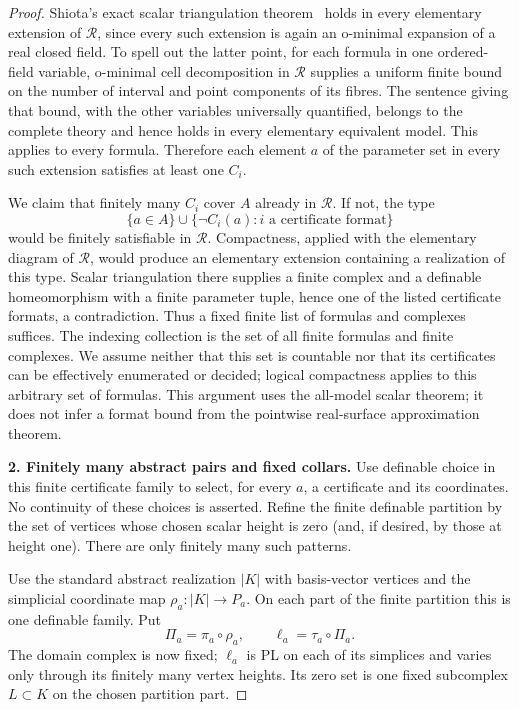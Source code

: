 \begin{proof}
Shiota's exact scalar triangulation theorem~\cite[Theorem 2.2(1), p.~6]{A5-Shiota} holds in every elementary
extension of $\mathcal R$, since every such extension is again an
o-minimal expansion of a real closed field. To spell out the latter point,
for each formula in one ordered-field variable, o-minimal cell decomposition
in $\mathcal R$ supplies a uniform finite bound on the number of interval
and point components of its fibres. The sentence giving that bound, with
the other variables universally quantified, belongs to the complete theory
and hence holds in every elementary equivalent model. This applies to
every formula. Therefore each element $a$ of the parameter set in every
such extension satisfies at least one $C_i$.

We claim that finitely many $C_i$ cover $A$ already in $\mathcal R$.
If not, the type
\[
 \{a\in A\}\cup\{\neg C_i(a): i\text{ a certificate format}\}
 \tag{A5.17.3}
\]
would be finitely satisfiable in $\mathcal R$. Compactness, applied with
the elementary diagram of $\mathcal R$, would produce an elementary
extension containing a realization of this type. Scalar triangulation
there supplies a finite complex and a definable homeomorphism with a
finite parameter tuple, hence one of the listed certificate formats,
a contradiction. Thus a fixed finite list of formulas and complexes
suffices. The indexing collection is the set of all finite formulas and
finite complexes. We assume neither that this set is countable nor that
its certificates can be effectively enumerated or decided; logical
compactness applies to this arbitrary set of formulas. This argument
uses the all-model scalar theorem; it does not
infer a format bound from the pointwise real-surface approximation theorem.

\medskip\noindent\textbf{2. Finitely many abstract pairs and fixed collars.}
Use definable choice in this finite certificate family to select, for every
$a$, a certificate and its coordinates. No continuity of these choices is
asserted. Refine the finite definable partition by the set of vertices
whose chosen scalar height is zero (and, if desired, by those at height
one). There are only finitely many such patterns.

Use the standard abstract realization $|K|$ with basis-vector vertices and
the simplicial coordinate map $\rho_a:|K|\to P_a$. On each part of the
finite partition this is one definable family. Put
\[
 \Pi_a=\pi_a\circ\rho_a,
 \qquad \ell_a=\tau_a\circ\Pi_a.
\]
The domain complex is now fixed; $\ell_a$ is PL on each of its simplices
and varies only through its finitely many vertex heights. Its zero set is
one fixed subcomplex $L\subset K$ on the chosen partition part.


\end{proof}
